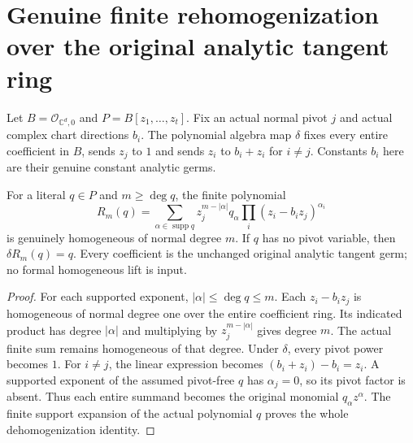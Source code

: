 \section{Genuine finite rehomogenization over the original analytic tangent ring}

Let $B=\mathcal O_{\mathbb C^d,0}$ and $P=B[z_1,\ldots,z_t]$.
Fix an actual normal pivot $j$ and actual complex chart directions $b_i$.
The polynomial algebra map $\delta$ fixes every entire coefficient in $B$,
sends $z_j$ to $1$ and sends $z_i$ to $b_i+z_i$ for $i\ne j$.
Constants $b_i$ here are their genuine constant analytic germs.

\begin{theorem}
\label{hir:actual-relative-finite-polynomial-rehomogenization}
\leanok
For a literal $q\in P$ and $m\ge\deg q$, the finite polynomial
\[
 R_m(q)=\sum_{\alpha\in\operatorname{supp}q}
 z_j^{m-|\alpha|}q_\alpha\prod_i(z_i-b_i z_j)^{\alpha_i}
\]
is genuinely homogeneous of normal degree $m$. If $q$ has no pivot
variable, then $\delta R_m(q)=q$. Every coefficient is the unchanged
original analytic tangent germ; no formal homogeneous lift is input.
\end{theorem}
\begin{proof}
For each supported exponent, $|\alpha|\le\deg q\le m$. Each
$z_i-b_i z_j$ is homogeneous of normal degree one over the entire
coefficient ring. Its indicated product has degree $|\alpha|$ and
multiplying by $z_j^{m-|\alpha|}$ gives degree $m$. The actual finite
sum remains homogeneous of that degree. Under $\delta$, every pivot
power becomes $1$. For $i\ne j$, the linear expression becomes
$(b_i+z_i)-b_i=z_i$. A supported exponent of the assumed pivot-free
$q$ has $\alpha_j=0$, so its pivot factor is absent. Thus each entire
summand becomes the original monomial $q_\alpha z^\alpha$.
The finite support expansion of the actual polynomial $q$ proves the
whole dehomogenization identity.
\end{proof}

